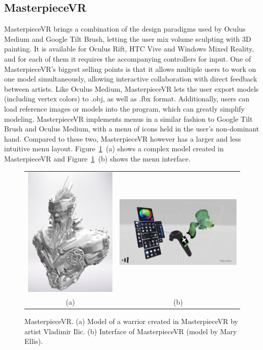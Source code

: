 \subsection{MasterpieceVR}
MasterpieceVR brings a combination of the design paradigms used by Oculus Medium and Google Tilt Brush, letting the user mix volume sculpting with 3D painting. It is available for Oculus Rift, HTC Vive and Windows Mixed Reality, and for each of them it requires the accompanying controllers for input. One of MasterpieceVR's biggest selling points is that it allows multiple users to work on one model simultaneously, allowing interactive collaboration with direct feedback between artists. Like Oculus Medium, MasterpieceVR lets the user export models (including vertex colors) to .obj, as well as .fbx format. Additionally, users can load reference images or models into the program, which can greatly simplify modeling. MasterpieceVR implements menus in a similar fashion to Google Tilt Brush and Oculus Medium, with a menu of icons held in the user's non-dominant hand. Compared to these two, MasterpieceVR however has a larger and less intuitive menu layout. Figure~\ref{fig:masterpieceVR}~(a) shows a complex model created in MasterpieceVR and Figure~\ref{fig:masterpieceVR}~(b) shows the menu interface.

\begin{figure}[!h]
    \centering
    \setlength{\tabcolsep}{0.0130\linewidth}
    \begin{tabular}{@{}cc@{}}
   	\includegraphics[width=0.35\linewidth]{figures/MasterpieceVR_Vladimir_Ilic}&
   	\includegraphics[width=0.5\linewidth]{figures/MasterpieceVR_interface}\\
    (a)&(b)\\
    \end{tabular}
    \caption[MasterpieceVR]{MasterpieceVR.
    	  \textup{(a)} Model of a warrior created in MasterpieceVR by artist Vladimir Ilic.
			  \textup{(b)} Interface of MasterpieceVR (model by Mary Ellis). 
      \label{fig:masterpieceVR}}
\end{figure}

